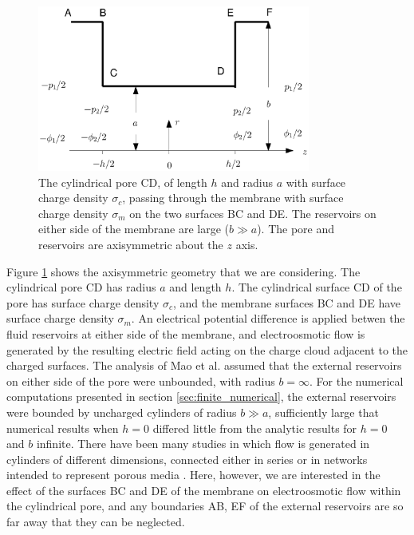 \begin{figure}[ht]
\centering
\includegraphics[width=0.8\textwidth]{finite_thickness/finite_pore_pic1.eps}
\caption{The cylindrical pore CD, of length $h$ and radius $a$ with surface charge density $\sigma_c$, passing through the membrane with surface charge density $\sigma_m$ on the two surfaces BC and DE. The reservoirs on either side of the membrane are large ($b\gg a$). The pore and reservoirs are axisymmetric about the $z$ axis.}
\label{Fig:schematic}
\end{figure}

Figure \ref{Fig:schematic} shows the axisymmetric geometry that we are considering. The cylindrical pore CD has radius $a$ and length $h$.
The cylindrical surface CD of the pore has surface charge density $\sigma_c$, and the membrane surfaces BC and DE have surface charge density $\sigma_m$. An electrical potential difference is applied betwen the fluid reservoirs at either side of the membrane, and electroosmotic flow is generated by the resulting electric field acting on the charge cloud adjacent to the charged surfaces.
The analysis of Mao et al. \cite{mao2014} assumed that the external reservoirs on either side of the pore were unbounded, with radius $b=\infty$. For the numerical computations presented in section \ref{sec:finite_numerical}, the external reservoirs were bounded by uncharged cylinders of radius $b\gg a$,  sufficiently large that numerical results when $h=0$ differed little from the analytic results for $h=0$ and $b$ infinite.  There have been many studies in which flow is generated in cylinders of different dimensions, connected either in series \cite{biscombe2012} or in networks intended to represent porous media \cite{jin1991}. Here, however, we are interested in the effect of the surfaces BC and DE of the membrane on electroosmotic flow within the cylindrical pore, and any boundaries AB, EF of the external reservoirs are so far away that they can be neglected.

